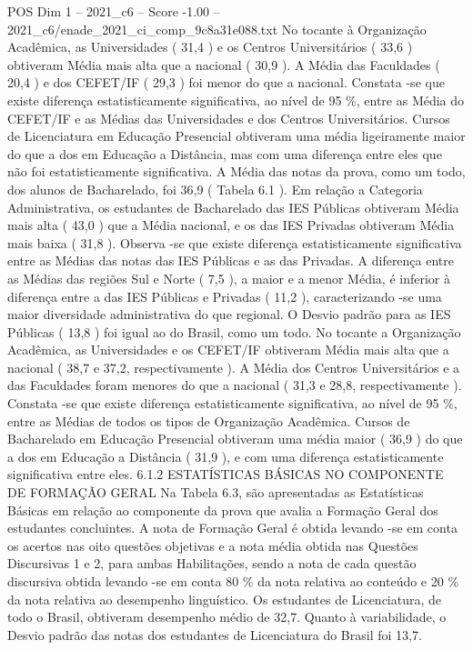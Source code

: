 \begin{textsample}{POS Dim 1 – 2021\_c6 – Score -1.00 – 2021\_c6/enade\_2021\_ci\_comp\_9c8a31e088.txt}
No tocante à Organização Acadêmica, as Universidades ( 31,4 ) e os Centros Universitários ( 33,6 ) obtiveram Média mais alta que a nacional ( 30,9 ).
A Média das Faculdades ( 20,4 ) e dos CEFET/IF ( 29,3 ) foi menor do que a nacional.
Constata -se que existe diferença estatisticamente significativa, ao nível de 95 \%, entre as Média do CEFET/IF e as Médias das Universidades e dos Centros Universitários.
Cursos de Licenciatura em Educação Presencial obtiveram uma média ligeiramente maior do que a dos em Educação a Distância, mas com uma diferença entre eles que não foi estatisticamente significativa.
A Média das notas da prova, como um todo, dos alunos de Bacharelado, foi 36,9 ( Tabela 6.1 ).
Em relação a Categoria Administrativa, os estudantes de Bacharelado das IES Públicas obtiveram Média mais alta ( 43,0 ) que a Média nacional, e os das IES Privadas obtiveram Média mais baixa ( 31,8 ).
Observa -se que existe diferença estatisticamente significativa entre as Médias das notas das IES Públicas e as das Privadas.
A diferença entre as Médias das regiões Sul e Norte ( 7,5 ), a maior e a menor Média, é inferior à diferença entre a das IES Públicas e Privadas ( 11,2 ), caracterizando -se uma maior diversidade administrativa do que regional.
O Desvio padrão para as IES Públicas ( 13,8 ) foi igual ao do Brasil, como um todo.
No tocante a Organização Acadêmica, as Universidades e os CEFET/IF obtiveram Média mais alta que a nacional ( 38,7 e 37,2, respectivamente ).
A Média dos Centros Universitários e a das Faculdades foram menores do que a nacional ( 31,3 e 28,8, respectivamente ).
Constata -se que existe diferença estatisticamente significativa, ao nível de 95 \%, entre as Médias de todos os tipos de Organização Acadêmica.
Cursos de Bacharelado em Educação Presencial obtiveram uma média maior ( 36,9 ) do que a dos em Educação a Distância ( 31,9 ), e com uma diferença estatisticamente significativa entre eles. 6.1.2 ESTATÍSTICAS BÁSICAS NO COMPONENTE DE FORMAÇÃO GERAL Na Tabela 6.3, são apresentadas as Estatísticas Básicas em relação ao componente da prova que avalia a Formação Geral dos estudantes concluintes.
A nota de Formação Geral é obtida levando -se em conta os acertos nas oito questões objetivas e a nota média obtida nas Questões Discursivas 1 e 2, para ambas Habilitações, sendo a nota de cada questão discursiva obtida levando -se em conta 80 \% da nota relativa ao conteúdo e 20 \% da nota relativa ao desempenho linguístico.
Os estudantes de Licenciatura, de todo o Brasil, obtiveram desempenho médio de 32,7.
Quanto à variabilidade, o Desvio padrão das notas dos estudantes de Licenciatura do Brasil foi 13,7.

\end{textsample}
